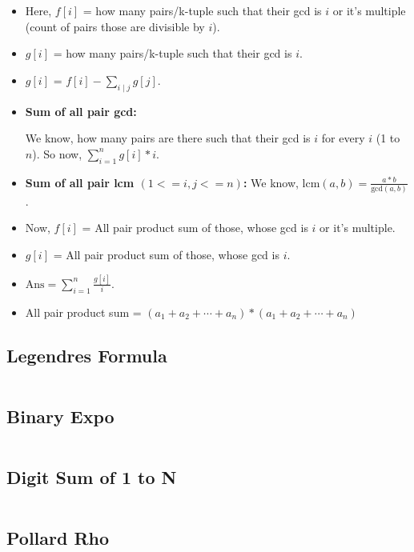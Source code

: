 {\footnotesize
\begin{itemize}
    \item Here, 
    $f[i]$ = how many pairs/k-tuple such that their gcd is $i$ or it’s multiple (count of pairs those are divisible by $i$).
    \item $g[i]$ = how many pairs/k-tuple such that their gcd is $i$.
    \item $g[i]$ = $f[i] - \sum_{i \mid j} g[j]$.
    \item \textbf{Sum of all pair gcd:}

    We know, how many pairs are there such that their gcd is $i$ for every $i$ (1 to $n$). So now,  
    $\sum_{i=1}^{n} g[i] * i$.

    \item \textbf{Sum of all pair lcm $(1<=i,j<=n)$:}
    We know, 
    $\text{lcm}(a, b) = \frac{a * b}{\text{gcd}(a,b)}$. 
    \item Now, $f[i]$ = All pair product sum of those, whose gcd is $i$ or it’s multiple. 
    \item $g[i]$ = All pair product sum of those, whose gcd is $i$.
    \item $\text{Ans} = \sum_{i=1}^{n} \frac{g[i]}{i}$.

    \item All pair product sum = $(a_1 + a_2 + \cdots + a_n) * (a_1 + a_2 + \cdots + a_n)$
\end{itemize}
}

\subsection{\small Legendres Formula  \scriptsize}
\inputminted[breaklines, breakanywhere]{c++}{code/03-Number Theory/09-Legendres Formula.cpp}

\subsection{\small Binary Expo  \scriptsize}
\inputminted[breaklines, breakanywhere]{c++}{code/03-Number Theory/10-Binary Expo.cpp}

\subsection{\small Digit Sum of 1 to N  \scriptsize}
\inputminted[breaklines, breakanywhere]{c++}{code/03-Number Theory/11-Digit Sum of 1 to N.cpp}

\subsection{\small Pollard Rho  \scriptsize}
\inputminted[breaklines, breakanywhere]{c++}{code/03-Number Theory/12-Pollard Rho.cpp}

